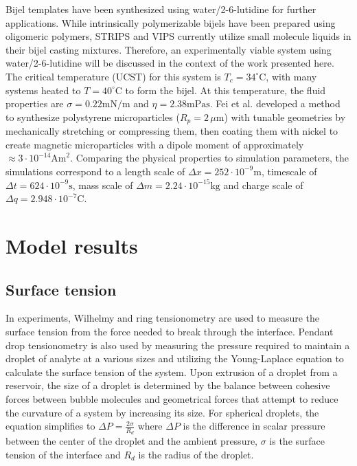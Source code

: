 Bijel templates have been synthesized using water/2-6-lutidine for further applications. \cite{lee_making_2013} 
While intrinsically polymerizable bijels have been prepared using oligomeric polymers, STRIPS and VIPS currently 
utilize small molecule liquids in their bijel casting mixtures. Therefore, an experimentally viable system using 
water/2-6-lutidine will be discussed in the context of the work presented here. The critical temperature (UCST) 
for this system is $T_c = 34 ^{\circ}\text{C}$, with many systems heated to $T = 40^{\circ}\text{C}$ to form the bijel. At this 
temperature, the fluid properties are $\sigma = 0.22 \text{mN/m}$ and $\eta = 2.38 \text{mPas}$. \cite{grattoni_lower_1993} 
Fei et al. developed a method to synthesize polystyrene microparticles ($R_p = 2\,\mu\text{m}$) with tunable geometries 
by mechanically stretching or compressing them, then coating them with nickel to create magnetic microparticles with 
a dipole moment of approximately$\approx 3 \cdot 10^{-14} \text{Am}^2$. \cite{fei_active_2017, fei_magneto-capillary_2020} 
Comparing the physical properties to simulation parameters, the simulations correspond to a length scale of
$\Delta x = 252 \cdot 10^{-9} \text{m}$, timescale of $\Delta t = 624 \cdot 10^{-9} \text{s}$, 
mass scale of $\Delta m = 2.24 \cdot 10^{-15} \text{kg}$ and charge scale of $\Delta q = 2.948 \cdot 10^{-7} \text{C}$. 

\section{Model results}
\label{section:model_results}

\subsection{Surface tension}
\label{section:model_surface_tension}

In experiments, Wilhelmy and ring tensionometry are used to measure the surface tension from the force needed 
to break through the interface. Pendant drop tensionometry is also used by measuring the pressure required to 
maintain a droplet of analyte at a various sizes and utilizing the Young-Laplace equation to calculate the 
surface tension of the system. \cite{sun_assembly_2013, berry_measurement_2015}
Upon extrusion of a droplet from a reservoir, the size of a droplet is determined by the balance between 
cohesive forces between bubble molecules and geometrical forces that attempt to reduce the curvature of a 
system by increasing its size. For spherical droplets, the equation simplifies to 
$\Delta P = \frac{2 \sigma}{R_d}$ where $\Delta P$ is the difference in scalar pressure 
between the center of the droplet and the ambient pressure, $\sigma$ is the surface tension 
of the interface and $R_d$ is the radius of the droplet. 

